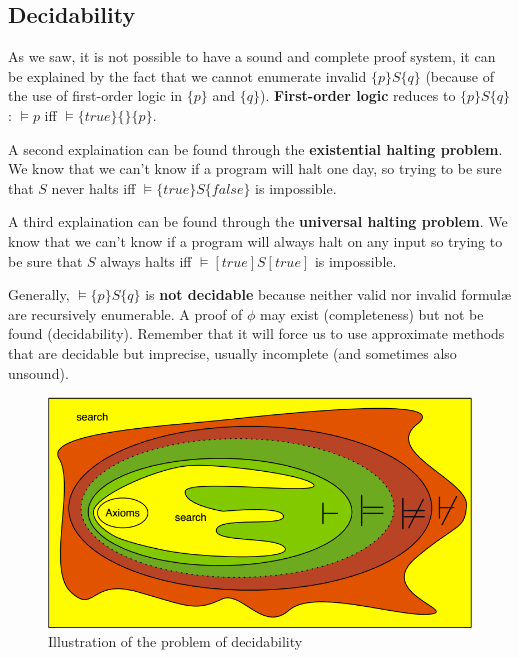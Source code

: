 \documentclass[12pt, a4paper]{book}
\begin{document}
\subsection{Decidability}
\label{sub:Decidability}

As we saw, it is not possible to have a sound and complete proof system, it can
be explained by the fact that we cannot enumerate invalid $\{p\}S\{q\}$ (because
of the use of first-order logic in $\{p\}$ and $\{q\}$). \textbf{First-order
logic} reduces to $\{p\}S\{q\}$: $\vDash p$ iff $\vDash \{true\} \{ \} \{p\}$.
\newline

A second explaination can be found through the \textbf{existential halting
problem}. We know that we can't know if a program will halt one day, so
trying to be sure that $S$ never halts iff $\vDash \{ true\} S \{ false\}$ is
impossible. \newline

A third explaination can be found through the \textbf{universal halting
problem}. We know that we can't know if a program will always halt on any input
so trying to be sure that $S$ always halts iff $\vDash [true] S [true]$ is
impossible. \newline

Generally, $\vDash \{ p \} S \{ q \}$ is \textbf{not decidable} because
neither valid nor invalid formul\ae{} are recursively enumerable. A proof of
$\phi$ may exist (completeness) but not be found (decidability). Remember that
it will force us to use approximate methods that are decidable but imprecise,
usually incomplete (and sometimes also unsound).

\begin{figure}[!ht]
    \centering
    \includegraphics[width=\linewidth]{decidability.png}
    \caption{Illustration of the problem of decidability}
\end{figure}
\end{document}
